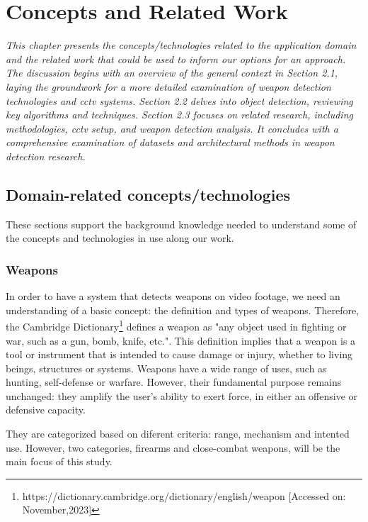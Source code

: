 
\renewcommand{\arraystretch}{2}
\renewcommand{\figurename}{Figure}
\chapter{Concepts and Related Work}
\label{chapter:literarure}

\newenvironment{literature}
{\quote\itshape}
{\endquote}

\begin{literature}
This chapter presents the concepts/technologies related to the application domain and the related work that could 
be used to inform our options for an approach.
 The discussion begins with an overview of the general context in Section 2.1, laying the 
 groundwork for a more detailed examination of weapon detection technologies and \ac{cctv} systems. Section 2.2 
 delves into object detection, reviewing key algorithms and techniques. Section 2.3 focuses on related research, 
 including methodologies, \ac{cctv} setup, and weapon detection analysis. It concludes with a comprehensive 
 examination of datasets and architectural methods in weapon detection research.
\end{literature}

\section{Domain-related concepts/technologies}
These sections support the background knowledge needed to understand some of the concepts and technologies in use along our work.
\subsection{Weapons}
In order to have a system that detects weapons on video footage, we need an understanding of a basic concept: 
the definition and types of weapons.  Therefore, the Cambridge Dictionary\footnote{https://dictionary.cambridge.org/dictionary/english/weapon  [Accessed on: November,2023]} defines a weapon 
as "any object used in fighting or war, such as a gun, bomb, knife, etc.". This definition implies that a weapon 
is a tool or instrument  that is intended to cause damage or injury, whether to 
living beings, structures or systems. Weapons have a wide range of uses, such as hunting, self-defense or warfare. 
However, their fundamental purpose 
remains unchanged: they amplify the user's ability to exert force, in either an offensive or defensive capacity.

They are categorized based on diferent criteria: range, mechanism and intented use.
However, two categories, firearms and close-combat weapons, will be the main focus of this study.

